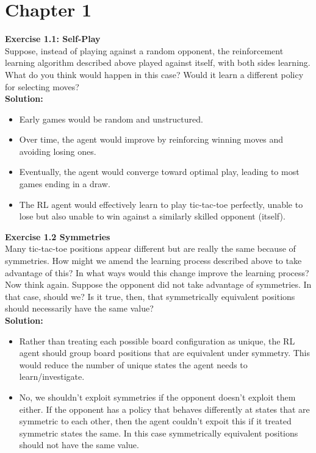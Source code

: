 \section*{Chapter 1}

\textbf{Exercise 1.1: Self-Play} \\
Suppose, instead of playing against a random opponent, the
reinforcement learning algorithm described above played against itself, with both sides
learning. What do you think would happen in this case? Would it learn a different policy
for selecting moves? \\

\textbf{Solution:}
\begin{itemize}
    \item Early games would be random and unstructured.
    \item Over time, the agent would improve by reinforcing winning moves and avoiding losing ones.
    \item Eventually, the agent would converge toward optimal play, leading to most games ending in a draw.
    \item The RL agent would effectively learn to play tic-tac-toe perfectly, unable to lose but also unable to win against a similarly skilled opponent (itself).
  \end{itemize}

\textbf{Exercise 1.2 Symmetries} \\
Many tic-tac-toe positions appear different but are really
the same because of symmetries. How might we amend the learning process described
above to take advantage of this? In what ways would this change improve the learning
process? Now think again. Suppose the opponent did not take advantage of symmetries.
In that case, should we? Is it true, then, that symmetrically equivalent positions should
necessarily have the same value?\\

\textbf{Solution:}
\begin{itemize}
    \item Rather than treating each possible board configuration as unique, the RL agent should group board positions that are equivalent under symmetry. This would reduce the number of unique states the agent needs to learn/investigate.
    \item No, we shouldn't exploit symmetries if the opponent doesn't exploit them either. If the opponent has a policy that behaves differently at states that are symmetric to each other, then the agent couldn't expoit this if it treated symmetric states the same. In this case symmetrically equivalent positions should not have the same value.
  \end{itemize}

